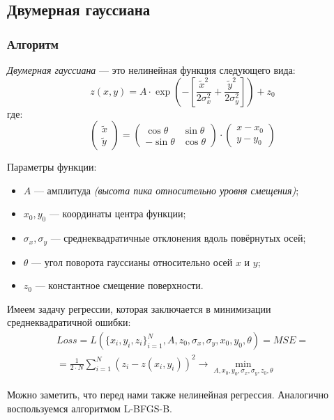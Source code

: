 \subsection{Двумерная гауссиана}

\subsubsection{Алгоритм}

\textit{Двумерная гауссиана} --- это нелинейная функция следующего вида:
\[
z(x, y) = A \cdot \exp \left( - \left[ \frac{\tilde{x}^2}{2\sigma_x^2} + \frac{\tilde{y}^2}{2\sigma_y^2} \right] \right) + z_0
\]
где:
\[
\begin{pmatrix}
\tilde{x} \\
\tilde{y}
\end{pmatrix}
=
\begin{pmatrix}
\cos\theta & \sin\theta \\
-\sin\theta & \cos\theta
\end{pmatrix}
\cdot
\begin{pmatrix}
x - x_0 \\
y - y_0
\end{pmatrix}
\]

Параметры функции:
\begin{itemize}
  \item $A$ --- амплитуда \textit{(высота пика относительно уровня смещения)};
  \item $x_0, y_0$ --- координаты центра функции;
  \item $\sigma_x, \sigma_y$ --- среднеквадратичные отклонения вдоль повёрнутых осей;
  \item $\theta$ --- угол поворота гауссианы относительно осей $x$ и $y$;
  \item $z_0$ --- константное смещение поверхности.
\end{itemize}

Имеем задачу регрессии, которая заключается в минимизации среднеквадратичной ошибки:
\[
\begin{gathered}
  Loss = L(\{x_i,y_i,z_i\}^N_{i=1},A,z_0,\sigma_x,\sigma_y,x_0,y_0,\theta) = MSE = \\
  =\frac{1}{2\cdot N} \sum_{i=1}^{N} (z_i - z(x_i,y_i))^2 \to \min_{A,x_0,y_0,\sigma_x,\sigma_y,z_0,\theta}
\end{gathered}
\]

Можно заметить, что перед нами также нелинейная регрессия. Аналогично воспользуемся алгоритмом L-BFGS-B.

